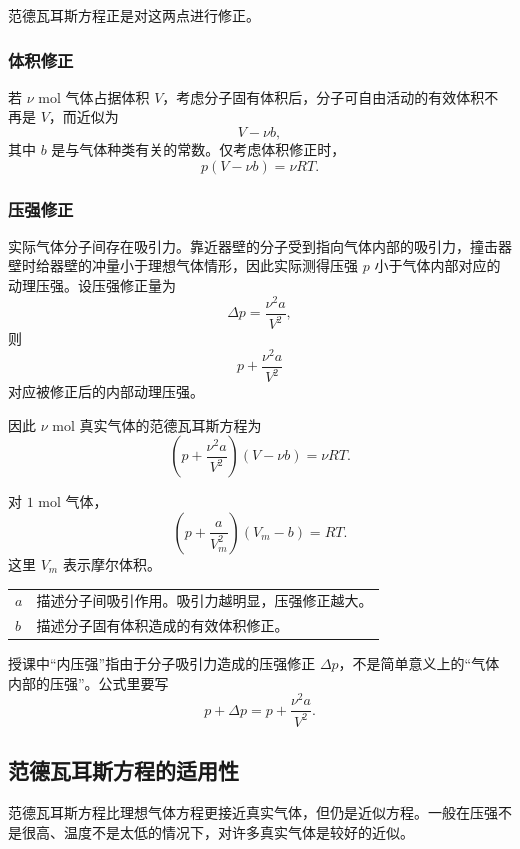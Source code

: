 范德瓦耳斯方程正是对这两点进行修正。

\subsubsection{体积修正}

若 \(\nu\) mol 气体占据体积 \(V\)，考虑分子固有体积后，分子可自由活动的有效体积不再是 \(V\)，而近似为
\[
  V-\nu b,
\]
其中 \(b\) 是与气体种类有关的常数。仅考虑体积修正时，
\[
  p(V-\nu b)=\nu RT.
\]

\subsubsection{压强修正}

实际气体分子间存在吸引力。靠近器壁的分子受到指向气体内部的吸引力，撞击器壁时给器壁的冲量小于理想气体情形，因此实际测得压强 \(p\) 小于气体内部对应的动理压强。设压强修正量为
\[
  \Delta p=\frac{\nu^2 a}{V^2},
\]
则
\[
  p+\frac{\nu^2a}{V^2}
\]
对应被修正后的内部动理压强。

因此 \(\nu\) mol 真实气体的范德瓦耳斯方程为
\[
  \boxed{
  \left(p+\frac{\nu^2a}{V^2}\right)(V-\nu b)=\nu RT
  }.
\]

对 \(1\) mol 气体，
\[
  \boxed{
  \left(p+\frac{a}{V_m^2}\right)(V_m-b)=RT
  }.
\]
这里 \(V_m\) 表示摩尔体积。

\begin{FormulaBox}[范德瓦耳斯参数的物理意义]
\begin{tabularx}{\textwidth}{@{}>{\bfseries}lX@{}}
\(a\) & 描述分子间吸引作用。吸引力越明显，压强修正越大。\\
\(b\) & 描述分子固有体积造成的有效体积修正。\\
\end{tabularx}
\end{FormulaBox}

\begin{WarnBox}
授课中“内压强”指由于分子吸引力造成的压强修正 \(\Delta p\)，不是简单意义上的“气体内部的压强”。公式里要写
\[
  p+\Delta p=p+\frac{\nu^2a}{V^2}.
\]
\end{WarnBox}

\subsection{范德瓦耳斯方程的适用性}

范德瓦耳斯方程比理想气体方程更接近真实气体，但仍是近似方程。一般在压强不是很高、温度不是太低的情况下，对许多真实气体是较好的近似。

